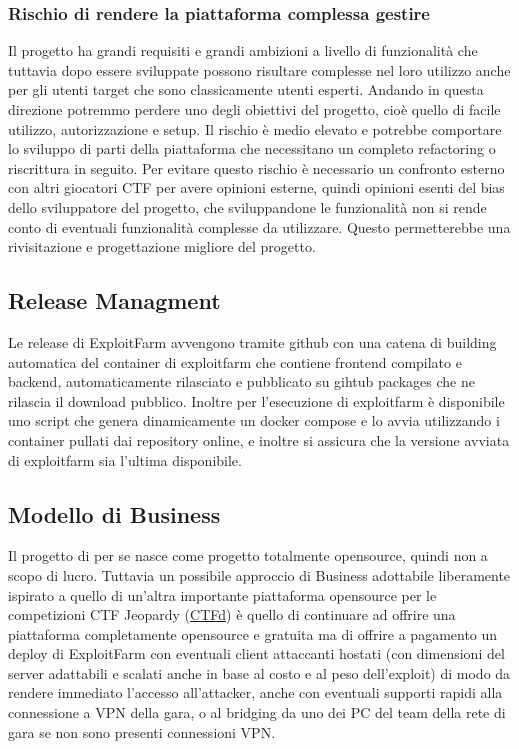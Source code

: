\documentclass[11pt]{article}
\begin{document}
\subsubsection{Rischio di rendere la piattaforma complessa gestire}
Il progetto ha grandi requisiti e grandi ambizioni a livello di funzionalità che tuttavia dopo essere sviluppate possono risultare complesse nel loro utilizzo anche per gli utenti target che sono classicamente utenti esperti. Andando in questa direzione potremmo perdere uno degli obiettivi del progetto, cioè quello di facile utilizzo, autorizzazione e setup. Il rischio è medio elevato e potrebbe comportare lo sviluppo di parti della piattaforma che necessitano un completo refactoring o riscrittura in seguito. Per evitare questo rischio è necessario un confronto esterno con altri giocatori CTF per avere opinioni esterne, quindi opinioni esenti del bias dello sviluppatore del progetto, che sviluppandone le funzionalità non si rende conto di eventuali funzionalità complesse da utilizzare. Questo permetterebbe una rivisitazione e progettazione migliore del progetto.
\subsection{Release Managment}
Le release di ExploitFarm avvengono tramite github con una catena di building automatica del container di exploitfarm che contiene frontend compilato e backend, automaticamente rilasciato e pubblicato su gihtub packages che ne rilascia il download pubblico.
Inoltre per l'esecuzione di exploitfarm è disponibile uno script che genera dinamicamente un docker compose e lo avvia utilizzando i container pullati dai repository online, e inoltre si assicura che la versione avviata di exploitfarm sia l'ultima disponibile.
\subsection{Modello di Business}
Il progetto di per se nasce come progetto totalmente opensource, quindi non a scopo di lucro. Tuttavia un possibile approccio di Business adottabile liberamente ispirato a quello di un'altra importante piattaforma opensource per le competizioni CTF Jeopardy (\href{https://github.com/CTFd/CTFd}{CTFd}) è quello di continuare ad offrire una piattaforma completamente opensource e gratuita ma di offrire a pagamento un deploy di ExploitFarm con eventuali client attaccanti hostati (con dimensioni del server adattabili e scalati anche in base al costo e al peso dell'exploit) di modo da rendere immediato l'accesso all'attacker, anche con eventuali supporti rapidi alla connessione a VPN della gara, o al bridging da uno dei PC del team della rete di gara se non sono presenti connessioni VPN.
\end{document}
